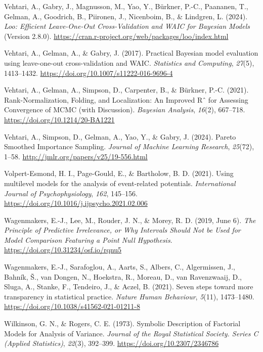 \documentclass[
  doc,12pt,floatsintext]{apa7}
\newlength{\cslhangindent}
\newenvironment{CSLReferences}[2] %
 {\begin{list}{}{%
  \setlength{\itemindent}{0pt}
  \setlength{\leftmargin}{0pt}
  \setlength{\parsep}{0pt}
  \ifodd #1
   \setlength{\leftmargin}{\cslhangindent}
   \setlength{\itemindent}{-1\cslhangindent}
  \fi
  \setlength{\itemsep}{#2\baselineskip}}}
 {\end{list}}
\begin{document}
\begin{CSLReferences}{1}{0}
Vehtari, A., Gabry, J., Magnusson, M., Yao, Y., Bürkner, P.-C., Paananen, T., Gelman, A., Goodrich, B., Piironen, J., Nicenboim, B., \& Lindgren, L. (2024). \emph{Loo: {Efficient Leave-One-Out Cross-Validation} and {WAIC} for {Bayesian Models}} (Version 2.8.0). \url{https://cran.r-project.org/web/packages/loo/index.html}

Vehtari, A., Gelman, A., \& Gabry, J. (2017). Practical {Bayesian} model evaluation using leave-one-out cross-validation and {WAIC}. \emph{Statistics and Computing}, \emph{27}(5), 1413--1432. \url{https://doi.org/10.1007/s11222-016-9696-4}

Vehtari, A., Gelman, A., Simpson, D., Carpenter, B., \& Bürkner, P.-C. (2021). Rank-{Normalization}, {Folding}, and {Localization}: {An Improved Rˆ} for {Assessing Convergence} of {MCMC} (with {Discussion}). \emph{Bayesian Analysis}, \emph{16}(2), 667--718. \url{https://doi.org/10.1214/20-BA1221}

Vehtari, A., Simpson, D., Gelman, A., Yao, Y., \& Gabry, J. (2024). Pareto {Smoothed Importance Sampling}. \emph{Journal of Machine Learning Research}, \emph{25}(72), 1--58. \url{http://jmlr.org/papers/v25/19-556.html}

Volpert-Esmond, H. I., Page-Gould, E., \& Bartholow, B. D. (2021). Using multilevel models for the analysis of event-related potentials. \emph{International Journal of Psychophysiology}, \emph{162}, 145--156. \url{https://doi.org/10.1016/j.ijpsycho.2021.02.006}

Wagenmakers, E.-J., Lee, M., Rouder, J. N., \& Morey, R. D. (2019, June 6). \emph{The {Principle} of {Predictive Irrelevance}, or {Why Intervals Should Not} be {Used} for {Model Comparison Featuring} a {Point Null Hypothesis}}. \url{https://doi.org/10.31234/osf.io/rqnu5}

Wagenmakers, E.-J., Sarafoglou, A., Aarts, S., Albers, C., Algermissen, J., Bahník, Š., van Dongen, N., Hoekstra, R., Moreau, D., van Ravenzwaaij, D., Sluga, A., Stanke, F., Tendeiro, J., \& Aczel, B. (2021). Seven steps toward more transparency in statistical practice. \emph{Nature Human Behaviour}, \emph{5}(11), 1473--1480. \url{https://doi.org/10.1038/s41562-021-01211-8}

Wilkinson, G. N., \& Rogers, C. E. (1973). Symbolic {Description} of {Factorial Models} for {Analysis} of {Variance}. \emph{Journal of the Royal Statistical Society. Series C (Applied Statistics)}, \emph{22}(3), 392--399. \url{https://doi.org/10.2307/2346786}

\end{CSLReferences}

\newpage



\end{document}
